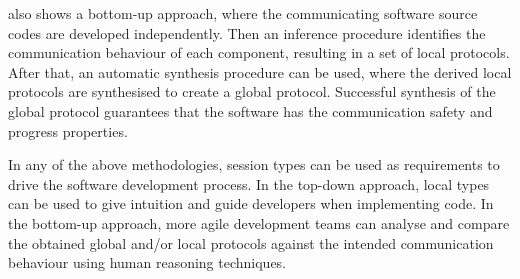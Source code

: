  also shows a bottom-up approach,
where the communicating software source codes are developed independently.
Then an inference  procedure identifies the communication behaviour
of each component, resulting in a set of local protocols.
After that, an automatic synthesis procedure can be used,
where the derived local protocols are synthesised
to create a global protocol. Successful synthesis of the global protocol guarantees that the
software has the communication safety and progress properties.


In any of the above methodologies, session types can be used as requirements 
to drive the software development process. In the top-down
approach, local types can be used to give intuition and guide
developers when implementing code.
In the bottom-up approach, more agile development teams
can analyse and compare the obtained global and/or local protocols
against the intended communication behaviour using human
reasoning techniques.







